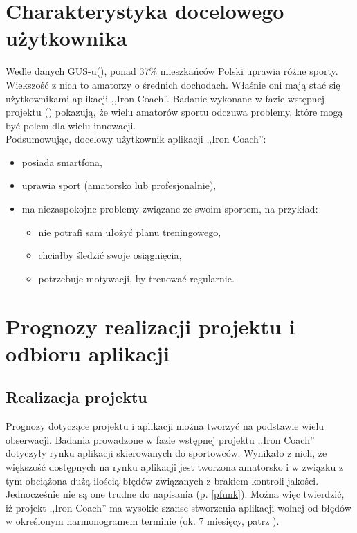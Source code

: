 \section{Charakterystyka docelowego użytkownika}
\noindent Wedle danych GUS-u(\cite{Gu}), ponad 37\% mieszkańców Polski uprawia różne sporty. Wiekszość z nich to amatorzy o średnich dochodach. Właśnie oni mają stać się użytkownikami aplikacji ,,Iron Coach''. Badanie wykonane w fazie wstępnej projektu (\cite{Ba}) pokazują, że wielu amatorów sportu odczuwa problemy, które mogą być polem dla wielu innowacji.
\\Podsumowując, docelowy użytkownik aplikacji ,,Iron Coach'':
\begin{itemize}
  \item posiada smartfona,
  \item uprawia sport (amatorsko lub profesjonalnie),
  \item ma niezaspokojne problemy związane ze swoim sportem, na przykład:
    \begin{itemize}
      \item nie potrafi sam ułożyć planu treningowego,
      \item chciałby śledzić swoje osiągnięcia,
      \item potrzebuje motywacji, by trenować regularnie.
    \end{itemize}
\end{itemize}
\section{Prognozy realizacji projektu i odbioru aplikacji}
\subsection{Realizacja projektu}
\noindent Prognozy dotyczące projektu i aplikacji można tworzyć na podstawie wielu obserwacji. Badania prowadzone w fazie wstępnej projektu ,,Iron Coach'' \cite{Ba} dotyczyły rynku aplikacji skierowanych do sportowców. Wynikało z nich, że większość dostępnych na rynku aplikacji jest tworzona amatorsko i w związku z tym obciążona dużą ilością błędów związanych z brakiem kontroli jakości. Jednocześnie nie są one trudne do napisania (p. \ref{pfunk}). Można więc twierdzić, iż projekt ,,Iron Coach'' ma wysokie szanse stworzenia aplikacji wolnej od błędów w określonym harmonogramem terminie (ok. 7 miesięcy, patrz \cite{Ha}). 
